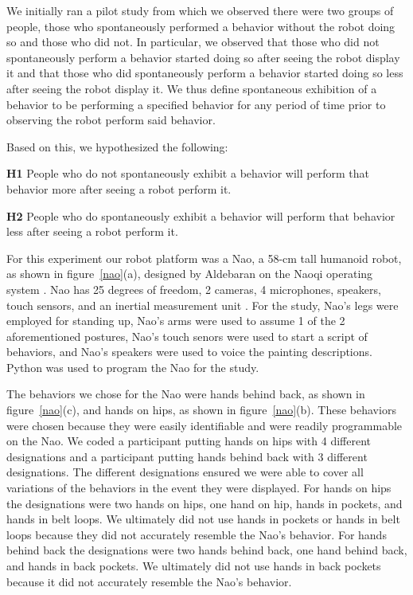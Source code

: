 \documentclass{acm_proc_article-sp}
\begin{document}
We initially ran a pilot study from which we observed there were two groups of people, those who spontaneously performed a behavior without the robot doing so and those who did not. In particular, we observed that those who did not spontaneously perform a behavior started doing so after seeing the robot display it and that those who did spontaneously perform a behavior started doing so less after seeing the robot display it. We thus define spontaneous exhibition of a behavior to be performing a specified behavior for any period of time prior to observing the robot perform said behavior.

Based on this, we hypothesized the following:

\textbf{H1}	People who do not spontaneously exhibit a behavior will perform that behavior more after seeing a robot perform it.

\textbf{H2} People who do spontaneously exhibit a behavior will perform that behavior less after seeing a robot perform it.

For this experiment our robot platform was a Nao, a 58-cm tall humanoid robot, as shown in figure~\ref{nao}(a), designed by Aldebaran on the Naoqi operating system \cite{naodocumentation}. Nao has 25 degrees of freedom, 2 cameras, 4 microphones, speakers, touch sensors, and an inertial measurement unit \cite{naodocumentation}. For the study, Nao's legs were employed for standing up, Nao's arms were used to assume 1 of the 2 aforementioned postures, Nao's touch senors were used to start a script of behaviors, and Nao's speakers were used to voice the painting descriptions. Python was used to program the Nao for the study. 

The behaviors we chose for the Nao were hands behind back, as shown in figure~\ref{nao}(c), and hands on hips, as shown in figure~\ref{nao}(b). These behaviors were chosen because they were easily identifiable and were readily programmable on the Nao. We coded a participant putting hands on hips with 4 different designations and a participant putting hands behind back with 3 different designations. The different designations ensured we were able to cover all variations of the behaviors in the event they were displayed. For hands on hips the designations were two hands on hips, one hand on hip, hands in pockets, and hands in belt loops. We ultimately did not use hands in pockets or hands in belt loops because they did not accurately resemble the Nao's behavior. For hands behind back the designations were two hands behind back, one hand behind back, and hands in back pockets. We ultimately did not use hands in back pockets because it did not accurately resemble the Nao's behavior. 
\end{document}
